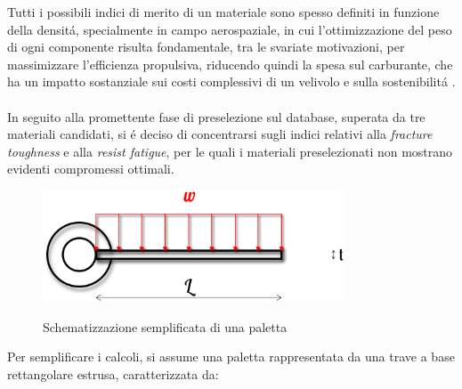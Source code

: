 \documentclass{article}
\begin{document}
        Tutti i possibili indici di merito di un materiale sono spesso definiti in funzione della densitá, specialmente in campo aerospaziale, in cui l’ottimizzazione del peso di ogni componente risulta fondamentale, tra le svariate motivazioni, per massimizzare l’efficienza propulsiva, riducendo quindi la spesa sul carburante, che ha un impatto sostanziale sui costi complessivi di un velivolo e sulla sostenibilitá \autocite{EASA_environ_report_2019}.
        \\ \\ 
        In seguito alla promettente fase di preselezione sul database,
        superata da tre materiali candidati, si é deciso di concentrarsi sugli indici relativi alla \textit{fracture toughness} e alla \textit{resist fatigue},
        per le quali i materiali preselezionati non mostrano evidenti compromessi ottimali.

        \begin{figure}[h!]
            \centering
             \label{blade_load}
            \includegraphics[width=0.8\textwidth]{Sources/blade_load.eps}
            \caption{Schematizzazione semplificata di una paletta \autocite{Inkscape}}
        \end{figure}
        \clearpage

        Per semplificare i calcoli, si assume una paletta rappresentata da una trave a base rettangolare
        estrusa, caratterizzata da:
\end{document}
